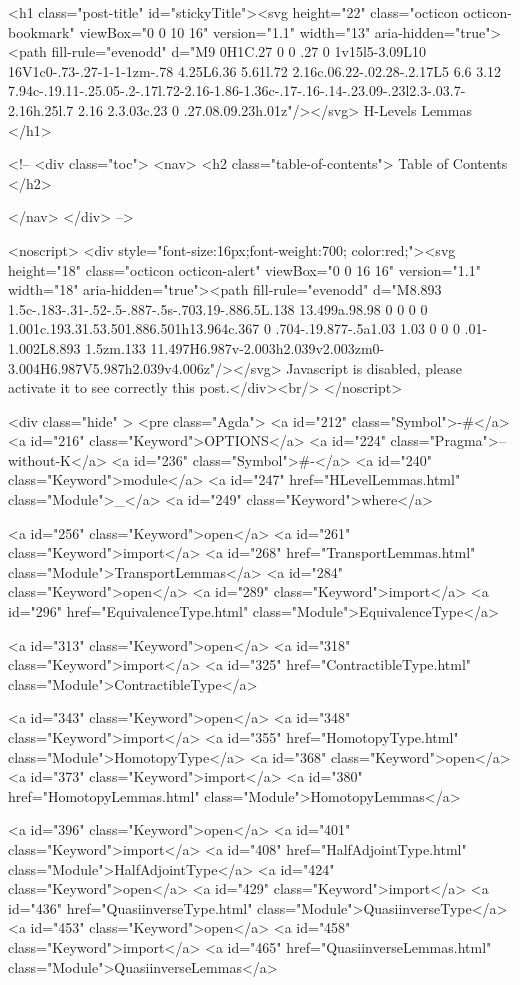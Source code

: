   <h1 class="post-title" id="stickyTitle"><svg height="22" class="octicon octicon-bookmark" viewBox="0 0 10 16" version="1.1" width="13" aria-hidden="true"><path fill-rule="evenodd" d="M9 0H1C.27 0 0 .27 0 1v15l5-3.09L10 16V1c0-.73-.27-1-1-1zm-.78 4.25L6.36 5.61l.72 2.16c.06.22-.02.28-.2.17L5 6.6 3.12 7.94c-.19.11-.25.05-.2-.17l.72-2.16-1.86-1.36c-.17-.16-.14-.23.09-.23l2.3-.03.7-2.16h.25l.7 2.16 2.3.03c.23 0 .27.08.09.23h.01z"/></svg> H-Levels Lemmas
  </h1>

  <!-- 
  <div class="toc">
    <nav>
    <h2 class="table-of-contents"> Table of Contents </h2>
      

    </nav>
  </div>
   -->

  <noscript>
  <div style="font-size:16px;font-weight:700; color:red;"><svg height="18" class="octicon octicon-alert" viewBox="0 0 16 16" version="1.1" width="18" aria-hidden="true"><path fill-rule="evenodd" d="M8.893 1.5c-.183-.31-.52-.5-.887-.5s-.703.19-.886.5L.138 13.499a.98.98 0 0 0 0 1.001c.193.31.53.501.886.501h13.964c.367 0 .704-.19.877-.5a1.03 1.03 0 0 0 .01-1.002L8.893 1.5zm.133 11.497H6.987v-2.003h2.039v2.003zm0-3.004H6.987V5.987h2.039v4.006z"/></svg> Javascript is disabled, please activate it to see correctly this post.</div><br/>
  </noscript>

  <div class="hide" >
<pre class="Agda">
<a id="212" class="Symbol">{-#</a> <a id="216" class="Keyword">OPTIONS</a> <a id="224" class="Pragma">--without-K</a> <a id="236" class="Symbol">#-}</a>
<a id="240" class="Keyword">module</a> <a id="247" href="HLevelLemmas.html" class="Module">_</a> <a id="249" class="Keyword">where</a>

<a id="256" class="Keyword">open</a> <a id="261" class="Keyword">import</a> <a id="268" href="TransportLemmas.html" class="Module">TransportLemmas</a>
<a id="284" class="Keyword">open</a> <a id="289" class="Keyword">import</a> <a id="296" href="EquivalenceType.html" class="Module">EquivalenceType</a>

<a id="313" class="Keyword">open</a> <a id="318" class="Keyword">import</a> <a id="325" href="ContractibleType.html" class="Module">ContractibleType</a>

<a id="343" class="Keyword">open</a> <a id="348" class="Keyword">import</a> <a id="355" href="HomotopyType.html" class="Module">HomotopyType</a>
<a id="368" class="Keyword">open</a> <a id="373" class="Keyword">import</a> <a id="380" href="HomotopyLemmas.html" class="Module">HomotopyLemmas</a>

<a id="396" class="Keyword">open</a> <a id="401" class="Keyword">import</a> <a id="408" href="HalfAdjointType.html" class="Module">HalfAdjointType</a>
<a id="424" class="Keyword">open</a> <a id="429" class="Keyword">import</a> <a id="436" href="QuasiinverseType.html" class="Module">QuasiinverseType</a>
<a id="453" class="Keyword">open</a> <a id="458" class="Keyword">import</a> <a id="465" href="QuasiinverseLemmas.html" class="Module">QuasiinverseLemmas</a>

